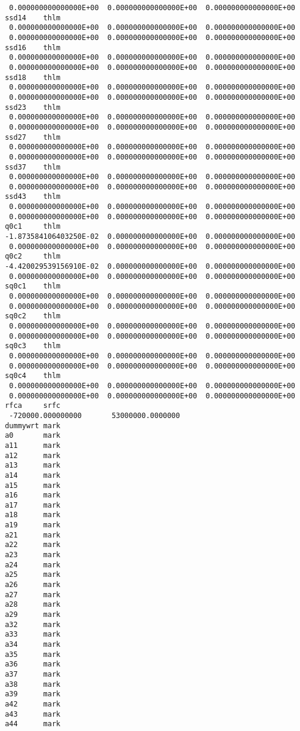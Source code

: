 \begin{footnotesize}
\begin{verbatim}
  0.000000000000000E+00  0.000000000000000E+00  0.000000000000000E+00
 ssd14    thlm
  0.000000000000000E+00  0.000000000000000E+00  0.000000000000000E+00
  0.000000000000000E+00  0.000000000000000E+00  0.000000000000000E+00
 ssd16    thlm
  0.000000000000000E+00  0.000000000000000E+00  0.000000000000000E+00
  0.000000000000000E+00  0.000000000000000E+00  0.000000000000000E+00
 ssd18    thlm
  0.000000000000000E+00  0.000000000000000E+00  0.000000000000000E+00
  0.000000000000000E+00  0.000000000000000E+00  0.000000000000000E+00
 ssd23    thlm
  0.000000000000000E+00  0.000000000000000E+00  0.000000000000000E+00
  0.000000000000000E+00  0.000000000000000E+00  0.000000000000000E+00
 ssd27    thlm
  0.000000000000000E+00  0.000000000000000E+00  0.000000000000000E+00
  0.000000000000000E+00  0.000000000000000E+00  0.000000000000000E+00
 ssd37    thlm
  0.000000000000000E+00  0.000000000000000E+00  0.000000000000000E+00
  0.000000000000000E+00  0.000000000000000E+00  0.000000000000000E+00
 ssd43    thlm
  0.000000000000000E+00  0.000000000000000E+00  0.000000000000000E+00
  0.000000000000000E+00  0.000000000000000E+00  0.000000000000000E+00
 q0c1     thlm
 -1.873584106403250E-02  0.000000000000000E+00  0.000000000000000E+00
  0.000000000000000E+00  0.000000000000000E+00  0.000000000000000E+00
 q0c2     thlm
 -4.420029539156910E-02  0.000000000000000E+00  0.000000000000000E+00
  0.000000000000000E+00  0.000000000000000E+00  0.000000000000000E+00
 sq0c1    thlm
  0.000000000000000E+00  0.000000000000000E+00  0.000000000000000E+00
  0.000000000000000E+00  0.000000000000000E+00  0.000000000000000E+00
 sq0c2    thlm
  0.000000000000000E+00  0.000000000000000E+00  0.000000000000000E+00
  0.000000000000000E+00  0.000000000000000E+00  0.000000000000000E+00
 sq0c3    thlm
  0.000000000000000E+00  0.000000000000000E+00  0.000000000000000E+00
  0.000000000000000E+00  0.000000000000000E+00  0.000000000000000E+00
 sq0c4    thlm
  0.000000000000000E+00  0.000000000000000E+00  0.000000000000000E+00
  0.000000000000000E+00  0.000000000000000E+00  0.000000000000000E+00
 rfca     srfc
  -720000.000000000       53000000.0000000
 dummywrt mark
 a0       mark
 a11      mark
 a12      mark
 a13      mark
 a14      mark
 a15      mark
 a16      mark
 a17      mark
 a18      mark
 a19      mark
 a21      mark
 a22      mark
 a23      mark
 a24      mark
 a25      mark
 a26      mark
 a27      mark
 a28      mark
 a29      mark
 a32      mark
 a33      mark
 a34      mark
 a35      mark
 a36      mark
 a37      mark
 a38      mark
 a39      mark
 a42      mark
 a43      mark
 a44      mark

\end{verbatim}
\end{footnotesize}
